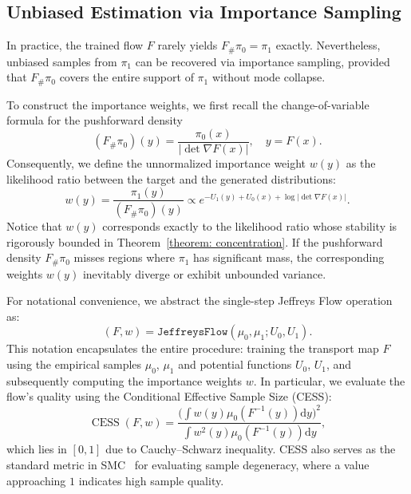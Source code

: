 \documentclass[%
 reprint,
 amsmath,amssymb,
 aps,
 pre,
]{revtex4-2}
\DeclareMathOperator{\CESS}{CESS}
\newcommand{\D}{\mathrm{d}}
\begin{document}
\mbox{}

\subsection{Unbiased Estimation via Importance Sampling}

In practice, the trained flow $F$ rarely yields $F_\#\pi_0 = \pi_1$ exactly. Nevertheless, unbiased samples from $\pi_1$ can be recovered via importance sampling, provided that $F_\#\pi_0$ covers the entire support of $\pi_1$ without mode collapse.

To construct the importance weights, we first recall the change-of-variable formula for the pushforward density
\begin{equation*}
	(F_\#\pi_0)(y) = \frac{\pi_0(x)}{|\det \nabla F(x)|}, \quad y =F(x).
\end{equation*}
Consequently, we define the unnormalized importance weight $w(y)$ as the likelihood ratio between the target and the generated distributions:
\begin{equation}
	w(y) = \frac{\pi_1(y)}{(F_\#\pi_0)(y)} \propto e^{- U_1(y) + U_0(x) + \log|\det \nabla F(x)|}.
\end{equation}
Notice that $w(y)$ corresponds exactly to the likelihood ratio whose stability is rigorously bounded in Theorem~\ref{theorem: concentration}. If the pushforward density $F_\#\pi_0$ misses regions where $\pi_1$ has significant mass, the corresponding weights $w(y)$ inevitably diverge or exhibit unbounded variance.

For notational convenience, we abstract the single-step Jeffreys Flow operation as:
\begin{equation*}
(F, w) = \mathtt{JeffreysFlow}(\mu_0 , \mu_1 ; U_0 , U_1 ).
\end{equation*}
This notation encapsulates the entire procedure: training the transport map $F$ using the empirical
samples $\mu_0$, $\mu_1$ and potential functions $U_0$, $U_1$, and subsequently computing the importance weights $w$. In particular, we evaluate the flow's quality using the Conditional Effective Sample Size (CESS):
\begin{equation}
	\CESS(F,w) = \frac{\big(\int w(y) \mu_0(F^{-1}(y))\D y\big)^2}{\int w^2(y) \mu_0(F^{-1}(y))\D y},
\end{equation}
which lies in $[0,1]$ due to Cauchy--Schwarz inequality. CESS also serves as the standard metric in SMC~\cite{doucet2001introduction} for evaluating sample degeneracy, where a value approaching $1$ indicates high sample quality.
\end{document}
